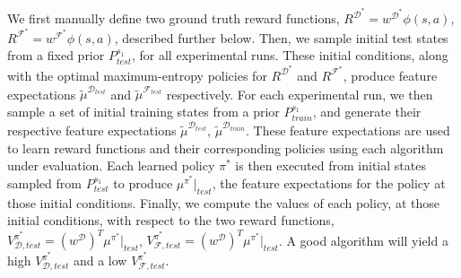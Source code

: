 \documentclass[letterpaper]{article}
\newcommand{\jm}[1]{\textcolor{blue}{Joao: #1}}
\newcommand{\jm}[1]{}
\begin{document}
We first manually define two ground truth reward functions, $R^{\mathcal{D}^*} = w^{\mathcal{D}^*}\phi(s,a)$, $R^{\mathcal{F}^*} = w^{\mathcal{F}^*}\phi(s,a)$, described further below. Then, we sample initial test states from a fixed prior $P^{s_1}_{test}$, for all experimental runs. These initial conditions, along with the optimal maximum-entropy policies for $R^{\mathcal{D}^*}$ and $R^{\mathcal{F}^*}$, produce feature expectations $\widetilde{\mu}^{\mathcal{D}_{test}}$ and $\widetilde{\mu}^{\mathcal{F}_{test}}$ respectively. For each experimental run, we then sample a set of initial training states from a prior $P^{s_{1}}_{train}$, and generate their respective feature expectations $\widetilde{\mu}^{\mathcal{D}_{test}}$, $\widetilde{\mu}^{\mathcal{D}_{train}}$. These feature expectations are used to learn reward functions and their corresponding  policies using each algorithm under evaluation. Each learned policy $\pi^*$ is then executed from initial states sampled from $P^{s_{1}}_{test}$ to produce $\mu^{\pi^*}|_{test}$, the feature expectations for the policy at those initial conditions. Finally, we compute the values of each policy, at those initial conditions, with respect to the two reward functions, $V^{\pi^*}_{\mathcal{D},test} = (w^\mathcal{D})^T\mu^{\pi^*}|_{test}$, $V^{\pi^*}_{\mathcal{F},test} = (w^\mathcal{D})^T\mu^{\pi^*}|_{test}$. A good algorithm will yield a high $V^{\pi^*}_{\mathcal{D},test}$ and a low $V^{\pi^*}_{\mathcal{F},test}$.


\end{document}
